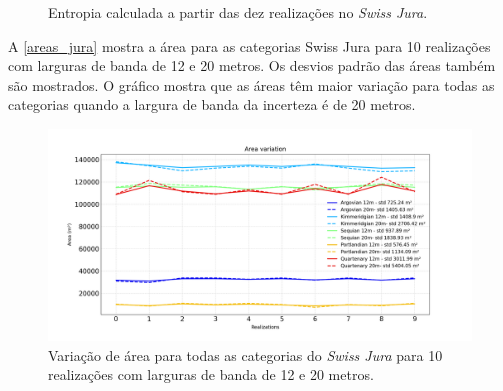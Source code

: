 \begin{figure}[H] 
    \centering
    \caption{Entropia calculada a partir das dez realizações no \textit{Swiss Jura}.} \label{jura_entropy}
     \hspace{1em}
\end{figure}

A \autoref{areas_jura} mostra a área para as categorias Swiss Jura para 10 realizações com larguras de banda de 12 e 20 metros. Os desvios padrão das áreas também são mostrados. O gráfico mostra que as áreas têm maior variação para todas as categorias quando a largura de banda da incerteza é de 20 metros.

\begin{figure}[H]
	\caption{\label{areas_jura} Variação de área para todas as categorias do \textit{Swiss Jura} para 10 realizações com larguras de banda de 12 e 20 metros.}
	\centering
		\includegraphics[width=\textwidth]{capitulo_3/imagens/areasjura.png}
\end{figure}

